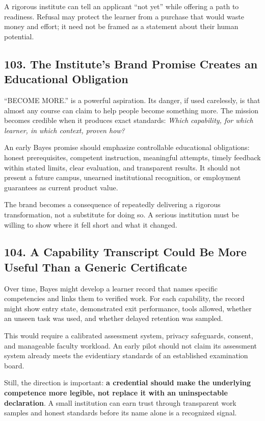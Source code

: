 A rigorous institute can tell an applicant ``not yet'' while offering a path to readiness. Refusal may protect the learner from a purchase that would waste money and effort; it need not be framed as a statement about their human potential.

\subsection*{103. The Institute's Brand Promise Creates an Educational Obligation}

``BECOME MORE.'' is a powerful aspiration. Its danger, if used carelessly, is that almost any course can claim to help people become something more. The mission becomes credible when it produces exact standards: \emph{Which capability, for which learner, in which context, proven how?}

An early Bayes promise should emphasize controllable educational obligations: honest prerequisites, competent instruction, meaningful attempts, timely feedback within stated limits, clear evaluation, and transparent results. It should not present a future campus, unearned institutional recognition, or employment guarantees as current product value.

The brand becomes a consequence of repeatedly delivering a rigorous transformation, not a substitute for doing so. A serious institution must be willing to show where it fell short and what it changed.

\subsection*{104. A Capability Transcript Could Be More Useful Than a Generic Certificate}

Over time, Bayes might develop a learner record that names specific competencies and links them to verified work. For each capability, the record might show entry state, demonstrated exit performance, tools allowed, whether an unseen task was used, and whether delayed retention was sampled.

This would require a calibrated assessment system, privacy safeguards, consent, and manageable faculty workload. An early pilot should not claim its assessment system already meets the evidentiary standards of an established examination board.

Still, the direction is important: \textbf{a credential should make the underlying competence more legible, not replace it with an uninspectable declaration}. A small institution can earn trust through transparent work samples and honest standards before its name alone is a recognized signal.
